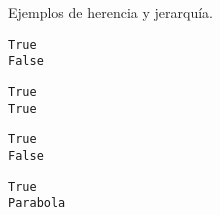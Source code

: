 \begin{code} Ejemplos de herencia y jerarquía.
\begin{Shaded}
\begin{Highlighting}[]
\OperatorTok{=}\OperatorTok{{-}}\NormalTok{,}\NormalTok{)}
\NormalTok{(}
\NormalTok{(}
\end{Highlighting}
\end{Shaded}

\begin{verbatim}
True
False
\end{verbatim}

\begin{Shaded}
\begin{Highlighting}[]
\OperatorTok{=}\NormalTok{,}\NormalTok{,}\NormalTok{)}
\NormalTok{(}
\NormalTok{(}
\end{Highlighting}
\end{Shaded}

\begin{verbatim}
True
True
\end{verbatim}

\begin{Shaded}
\begin{Highlighting}[]
\NormalTok{(}
\NormalTok{(}
\end{Highlighting}
\end{Shaded}

\begin{verbatim}
True
False
\end{verbatim}

\begin{Shaded}
\begin{Highlighting}[]
\OperatorTok{==}
\NormalTok{)}
\end{Highlighting}
\end{Shaded}

\begin{verbatim}
True
Parabola
\end{verbatim}
\end{code}

